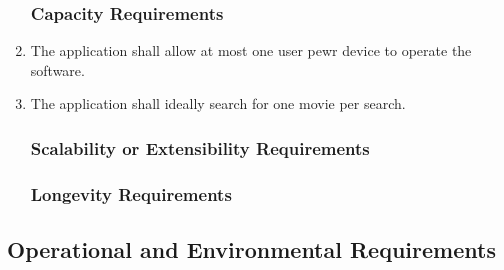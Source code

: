\documentclass[]{article}
\begin{document}
\begin{enumerate}[{PR}1. ]
\subsubsection{Capacity Requirements}
\label{ssub:capacity_requirements}
	\item The application shall allow at most one user pewr device to operate the software.
	\item The application shall ideally search for one movie per search.

\subsubsection{Scalability or Extensibility Requirements}
\label{ssub:scalability_or_extensibility_requirements}


\subsubsection{Longevity Requirements}
\label{ssub:longevity_requirements}
\end{enumerate}


\subsection{Operational and Environmental Requirements}
\label{sub:operational_and_environmental_requirements}
\end{document}
